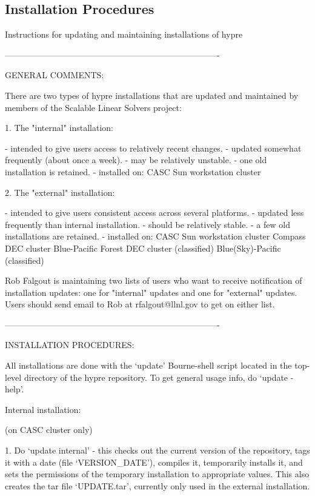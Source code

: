 \subsection{Installation Procedures}

    Instructions for updating and maintaining installations of hypre

----------------------------------------------------------------------------

GENERAL COMMENTS:

There are two types of hypre installations that are updated and
maintained by members of the Scalable Linear Solvers project:

  1. The "internal" installation:

    - intended to give users access to relatively recent changes.
    - updated somewhat frequently (about once a week).
    - may be relatively unstable.
    - one old installation is retained.
    - installed on:
        CASC Sun workstation cluster

  2. The "external" installation:

    - intended to give users consistent access across several platforms.
    - updated less frequently than internal installation.
    - should be relatively stable.
    - a few old installations are retained.
    - installed on:
        CASC Sun workstation cluster
        Compass DEC cluster
        Blue-Pacific
        Forest DEC cluster  (classified)
        Blue(Sky)-Pacific   (classified)

Rob Falgout is maintaining two lists of users who want to receive
notification of installation updates: one for "internal" updates and
one for "external" updates.  Users should send email to Rob at
rfalgout@llnl.gov to get on either list.

----------------------------------------------------------------------------

INSTALLATION PROCEDURES:

All installations are done with the `update' Bourne-shell script
located in the top-level directory of the hypre repository.  To
get general usage info, do `update -help'.

Internal installation:

  (on CASC cluster only)

  1. Do `update internal' - this checks out the current version of the
     repository, tags it with a date (file `VERSION_DATE'), compiles it,
     temporarily installs it, and sets the permissions of the temporary
     installation to appropriate values.  This also creates the tar file
     `UPDATE.tar', currently only used in the external installation.

